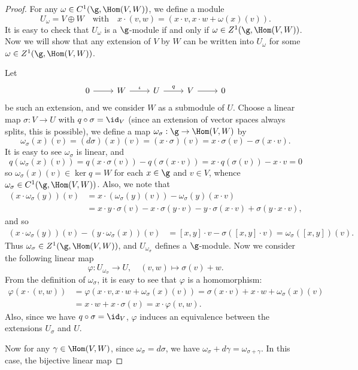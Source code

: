 \begin{proof}
For any $\omega\in C^1(\g,\Hom(V,W))$, we define a module
\[U_\omega=V\oplus W\quad\text{with}\quad x\cdot(v,w)=(x\cdot v,x\cdot w+\omega(x)(v)).\]
It is easy to check that $U_\omega$ is a $\g$-module if and only if $\omega\in Z^1(\g,\Hom(V,W))$. Now we will show that any extension of $V$ by $W$ can be written into $U_\omega$ for some $\omega\in Z^1(\g,\Hom(V,W))$.\par
Let 
\[\begin{tikzcd}
0\ar[r]&W\ar[r,"\iota"]&U\ar[r,"q"]&V\ar[r]&0
\end{tikzcd}\]
be such an extension, and we consider $W$ as a submodule of $U$. Choose a linear map $\sigma:V\to U$ with $q\circ\sigma=\id_V$ (since an extension of vector spaces always splits, this is possible), we define a map $\omega_{\sigma}:\g\to\Hom(V,W)$ by
\[\omega_{\sigma}(x)(v)=(d\sigma)(x)(v)=(x\cdot\sigma)(v)=x\cdot\sigma(v)-\sigma(x\cdot v).\]
It is easy to see $\omega_{\sigma}$ is linear, and
\[q(\omega_\sigma(x)(v))=q(x\cdot\sigma(v))-q(\sigma(x\cdot v))=x\cdot q(\sigma(v))-x\cdot v=0\]
so $\omega_\sigma(x)(v)\in\ker q=W$ for each $x\in\g$ and $v\in V$, whence $\omega_\sigma\in C^1(\g,\Hom(V,W))$. Also, we note that 
\begin{align*}
(x\cdot\omega_{\sigma}(y))(v)&=x\cdot(\omega_{\sigma}(y)(v))-\omega_{\sigma}(y)(x\cdot v)\\
&=x\cdot y\cdot\sigma(v)-x\cdot\sigma(y\cdot v)-y\cdot\sigma(x\cdot v)+\sigma(y\cdot x\cdot v),
\end{align*}
and so
\begin{align*}
(x\cdot\omega_{\sigma}(y))(v)-(y\cdot\omega_{\sigma}(x))(v)&=[x,y]\cdot v-\sigma([x,y]\cdot v)=\omega_{\sigma}([x,y])(v).
\end{align*}
Thus $\omega_\sigma\in Z^1(\g,\Hom(V,W))$, and $U_{\omega_\sigma}$ defines a $\g$-module. Now we consider the following linear map
\[\varphi:U_{\omega_{\sigma}}\to U,\quad (v,w)\mapsto \sigma(v)+w.\]
From the definition of $\omega_{\sigma}$, it is easy to see that $\varphi$ is a homomorphism:
\begin{align*}
\varphi(x\cdot(v,w))&=\varphi(x\cdot v,x\cdot w+\omega_{\sigma}(x)(v))=\sigma(x\cdot v)+x\cdot w+\omega_\sigma(x)(v)\\
&=x\cdot w+x\cdot\sigma(v)=x\cdot\varphi(v,w).
\end{align*}
Also, since we have $q\circ\sigma=\id_V$, $\varphi$ induces an equivalence between the extensions $U_\sigma$ and $U$.\par
Now for any $\gamma\in\Hom(V,W)$, since $\omega_\sigma=d\sigma$, we have $\omega_{\sigma}+d\gamma=\omega_{\sigma+\gamma}$. In this case, the bijective linear map

\end{proof}
